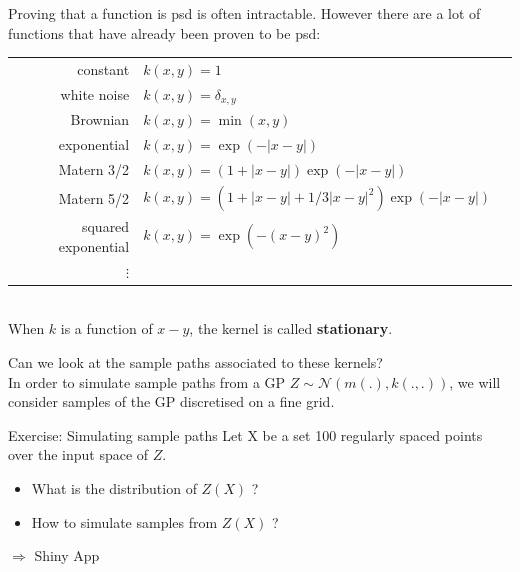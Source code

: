 \documentclass{beamer}
\begin{document}
\begin{frame}{}
Proving that a function is psd is often intractable. However there are a lot of functions that have already been proven to be psd:\\
\vspace{2mm}
\footnotesize
\begin{tabular}{rlN}
		constant & $ \displaystyle k(x,y) = 1 $ &\\[4mm]
		white noise & $ \displaystyle k(x,y) = \delta_{x,y} $ &\\[4mm]
		Brownian & $ \displaystyle k(x,y) =  \min (x,y) $ &\\[4mm]
		exponential & $\displaystyle k(x,y) = \exp \left(- |x-y| \right)$ &\\[4mm]
		Matern 3/2 & $\displaystyle k(x,y) = \left(1 + |x-y| \right) \exp \left(- |x-y| \right)$ &\\[4mm]
		Matern 5/2 & $\displaystyle k(x,y) = \left(1 + |x-y| + 1/3|x-y|^2 \right) \exp \left(- |x-y| \right)$ &\\[4mm]
		squared exponential & $\displaystyle k(x,y) = \exp \left(- (x-y)^2 \right)$ &\\[4mm]
		$\vdots$ & 
\end{tabular}\\
\vspace{2mm}
\normalsize
When $k$ is a function of $x-y$, the kernel is called \textbf{stationary}.
\end{frame}

\begin{frame}{}
Can we look at the sample paths associated to these kernels?\\
\vspace{5mm}
In order to simulate sample paths from a GP $Z \sim \mathcal{N}(m(.),k(.,.))$, we will consider samples of the GP discretised on a fine grid.
\vspace{5mm}
\begin{exampleblock}{Exercise: Simulating sample paths}
Let X be a set 100 regularly spaced points over the input space of $Z$.
\begin{itemize}
	\item What is the distribution of $Z(X)$ ?
	\item How to simulate samples from $Z(X)$ ?
\end{itemize}
\end{exampleblock}
\vspace{5mm}
$\Rightarrow$ Shiny App
\end{frame}
\end{document}
